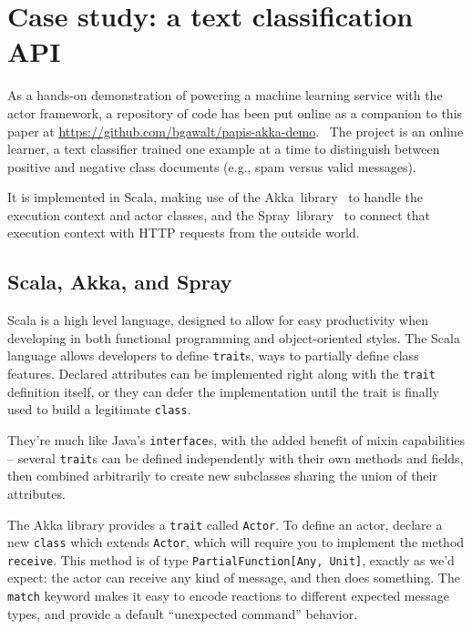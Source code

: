 \documentclass[tablecaption=bottom,wcp]{jmlr}
\begin{document}
\section{Case study: a text classification API}

As a hands-on demonstration of powering a machine learning service with
the actor framework, a repository of code has been put online as a companion 
to this paper at \url{https://github.com/bgawalt/papis-akka-demo}.~\cite{gawalt_papis_demo}
The project is an online learner, a text classifier trained one example at a time
to distinguish between positive and negative class documents (e.g., spam 
versus valid messages).

It is implemented in Scala, making use of the Akka~library~\cite{akka_doc}
to handle the execution context and actor classes, and the Spray~library~\cite{spray_doc}
to connect that execution context with HTTP requests from the outside world.

\subsection{Scala, Akka, and Spray}

Scala is a high level language, designed to allow for easy productivity when
developing in both functional programming and object-oriented styles. The
Scala language allows developers to define \texttt{trait}s, ways to partially 
define class features. Declared attributes can be implemented right
along with the \texttt{trait} definition itself, or they can defer the implementation
until the trait is finally used to build a legitimate \texttt{class}.

They're much like Java's \texttt{interface}s, with the added benefit of mixin 
capabilities -- several \texttt{trait}s can be defined independently with their own
 methods and fields, then combined arbitrarily to create new subclasses sharing
 the union of their attributes.

The Akka library provides a \texttt{trait} called \texttt{Actor}. To define an actor, 
declare a new \texttt{class} which extends \texttt{Actor}, which will require you to
implement the method \texttt{receive}. This method is of type \texttt{PartialFunction[Any,~Unit]},
exactly as we'd expect: the actor can receive any kind of message, and then does 
something. The \texttt{match} keyword makes it easy to encode reactions to different
expected message types, and provide a default ``unexpected command'' behavior.
\end{document}
